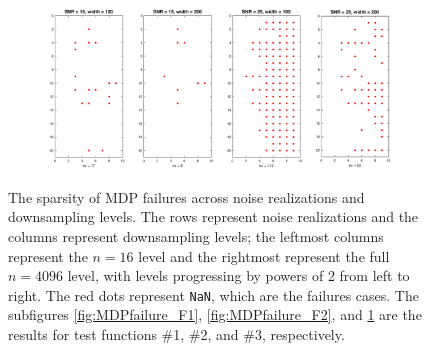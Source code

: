 \documentclass[12pt]{article}
\begin{document}
\begin{figure}
    \begin{subfigure}[b]{0.75\textwidth}
        \includegraphics[width=\textwidth]{Figures/MDPfailures1D_F3_R20.eps}
        \caption{}
        \label{fig:MDPfailure_F3}
    \end{subfigure}
    \caption{The sparsity of MDP failures across noise realizations and downsampling levels. The rows represent noise realizations and the columns represent downsampling levels; the leftmost columns represent the $n = 16$ level and the rightmost represent the full $n = 4096$ level, with levels progressing by powers of 2 from left to right. The red dots represent \texttt{NaN}, which are the failures cases. The subfigures \ref{fig:MDPfailure_F1}, \ref{fig:MDPfailure_F2}, and \ref{fig:MDPfailure_F3} are the results for test functions \#1, \#2, and \#3, respectively.}
\label{fig:MDPfailures}
\end{figure}
\end{document}
